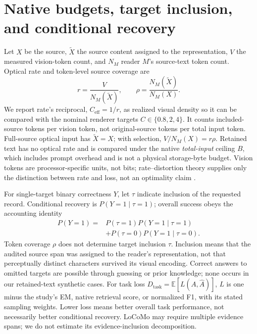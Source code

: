 \documentclass{article}
\begin{document}
\section{Native budgets, target inclusion, and conditional recovery}
Let $X$ be the source, $\tilde X$ the source content assigned to the representation, $V$ the measured vision-token count, and $N_M$ reader $M$'s source-text token count. Optical rate and token-level source coverage are
\begin{equation}
r=\frac{V}{N_M(\tilde X)},\qquad \rho=\frac{N_M(\tilde X)}{N_M(X)}.
\label{eq:accounting}
\end{equation}
We report rate's reciprocal, $C_{\mathrm{eff}}=1/r$, as realized visual density so it can be compared with the nominal renderer targets $C\in\{0.8,2,4\}$. It counts included-source tokens per vision token, not original-source tokens per total input token. Full-source optical input has $\tilde X=X$; with selection, $V/N_M(X)=r\rho$. Retained text has no optical rate and is compared under the native \emph{total-input} ceiling $B$, which includes prompt overhead and is not a physical storage-byte budget. Vision tokens are processor-specific units, not bits; rate--distortion theory supplies only the distinction between rate and loss, not an optimality claim \citep[Chapter~10]{coverthomas}.

For single-target binary correctness $Y$, let $\tau$ indicate inclusion of the requested record. Conditional recovery is $P(Y=1\mid\tau=1)$; overall success obeys the accounting identity
\begin{equation}
\begin{split}
P(Y=1)={}&P(\tau=1)P(Y=1\mid\tau=1)\\
         &+P(\tau=0)P(Y=1\mid\tau=0).
\end{split}
\label{eq:success}
\end{equation}
Token coverage $\rho$ does not determine target inclusion $\tau$. Inclusion means that the audited source span was assigned to the reader's representation, not that perceptually distinct characters survived its visual encoding. Correct answers to omitted targets are possible through guessing or prior knowledge; none occurs in our retained-text synthetic cases. For task loss $D_{\mathrm{task}}=\mathbb{E}[L(A,\hat A)]$, $L$ is one minus the study's EM, native retrieval score, or normalized F1, with its stated sampling weights. Lower loss means better overall task performance, not necessarily better conditional recovery. LoCoMo may require multiple evidence spans; we do not estimate its evidence-inclusion decomposition.
\end{document}
